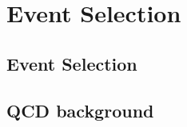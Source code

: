 \chapter{Event Selection}
\label{sec:selection}

\section{Event Selection}

\section{QCD background}
\label{sec:qcdbckg}